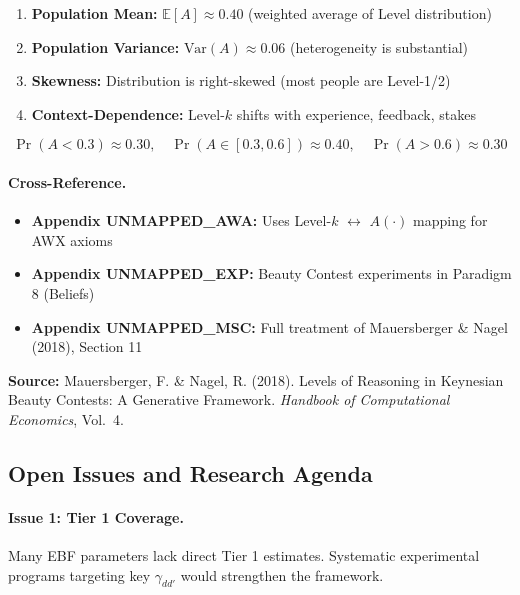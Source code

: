 \begin{enumerate}[nosep]
    \item \textbf{Population Mean:} $\mathbb{E}[A] \approx 0.40$ (weighted average of Level distribution)
    \item \textbf{Population Variance:} $\text{Var}(A) \approx 0.06$ (heterogeneity is substantial)
    \item \textbf{Skewness:} Distribution is right-skewed (most people are Level-1/2)
    \item \textbf{Context-Dependence:} Level-$k$ shifts with experience, feedback, stakes
\end{enumerate}

\begin{equation}
\Pr(A < 0.3) \approx 0.30, \quad \Pr(A \in [0.3, 0.6]) \approx 0.40, \quad \Pr(A > 0.6) \approx 0.30
\tag{BBB-LK}
\end{equation}

\paragraph{Cross-Reference.}
\begin{itemize}[nosep]
    \item \textbf{Appendix UNMAPPED_AWA:} Uses Level-$k$ $\leftrightarrow$ $A(\cdot)$ mapping for AWX axioms
    \item \textbf{Appendix UNMAPPED_EXP:} Beauty Contest experiments in Paradigm 8 (Beliefs)
    \item \textbf{Appendix UNMAPPED_MSC:} Full treatment of Mauersberger \& Nagel (2018), Section 11
\end{itemize}

\textbf{Source:} Mauersberger, F. \& Nagel, R. (2018). Levels of Reasoning in Keynesian
Beauty Contests: A Generative Framework. \textit{Handbook of Computational Economics}, Vol.\ 4.


\subsection{Open Issues and Research Agenda}
\label{sec:BBB-openissues}

\paragraph{Issue 1: Tier 1 Coverage.}
Many EBF parameters lack direct Tier 1 estimates. Systematic experimental
programs targeting key $\gamma_{dd'}$ would strengthen the framework.

